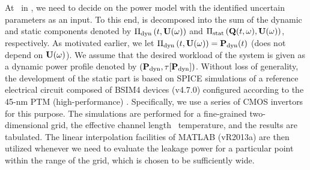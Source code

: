 At \ in , we need to decide on the power model with the identified uncertain parameters as an input.
To this end,  is decomposed into the sum of the dynamic and static components denoted by $\oPower{\dyn}{\t, \vU(\o)}$ and $\oPower{\stat}{\vTO(\t, \o), \vU(\o)}$, respectively.
As motivated earlier, we let $\oPower{\dyn}{\t, \vU(\o)} = \vP_\dyn(\t)$ (does not depend on $\mathbf{U}(\omega)$).
We assume that the desired workload of the system is given as a dynamic power profile denoted by $\profilePdyn$.
Without loss of generality, the development of the static part is based on SPICE simulations of a reference electrical circuit composed of BSIM4 devices (v4.7.0) \cite{bsim} configured according to the 45-nm PTM (high-performance) \cite{ptm}.
Specifically, we use a series of CMOS invertors for this purpose.
The simulations are performed for a fine-grained two-dimensional grid, the effective channel length \vs\ temperature, and the results are tabulated.
The linear interpolation facilities of MATLAB (vR2013a) \cite{matlab} are then utilized whenever we need to evaluate the leakage power for a particular point within the range of the grid, which is chosen to be sufficiently wide.
